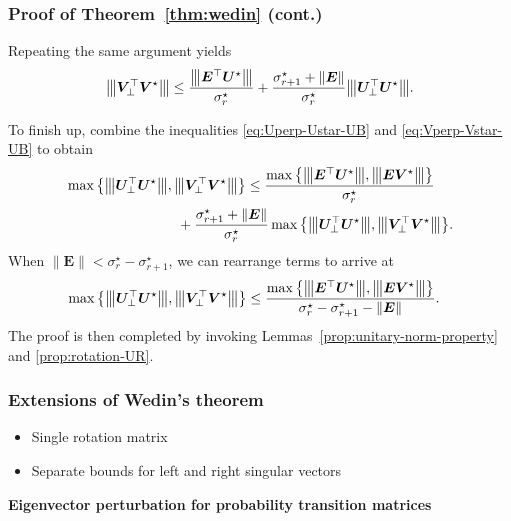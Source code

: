 \documentclass[compress,
mathserif,wide,%
]{beamer}
\begin{document}
\begin{frame}
	\frametitle{Proof of Theorem~\ref{thm:wedin} (cont.)}
	
	Repeating the same argument yields
%
\begin{align}
{\big\vert\kern-0.25ex\big\vert\kern-0.25ex\big\vert \bm{V}_{\perp}^{\top}\bm{V}^{\star} \big\vert\kern-0.25ex\big\vert\kern-0.25ex\big\vert}\leq\frac{{\big\vert\kern-0.25ex\big\vert\kern-0.25ex\big\vert \bm{E}^{\top}\bm{U}^{\star} \big\vert\kern-0.25ex\big\vert\kern-0.25ex\big\vert}}{\sigma_{r}^{\star}}
	+\frac{\sigma_{r+1}^{\star}+\|\bm{E}\|}{\sigma_{r}^{\star}}{\big\vert\kern-0.25ex\big\vert\kern-0.25ex\big\vert \bm{U}_{\perp}^{\top}\bm{U}^{\star} \big\vert\kern-0.25ex\big\vert\kern-0.25ex\big\vert}.
	\label{eq:Vperp-Vstar-UB}
\end{align}


To finish up, combine the inequalities \eqref{eq:Uperp-Ustar-UB} and \eqref{eq:Vperp-Vstar-UB} to obtain
%
\begin{align*}
 & \max\big\{ \vertiiibig{\bm{U}_{\perp}^{\top}\bm{U}^{\star}},\vertiiibig{\bm{V}_{\perp}^{\top}\bm{V}^{\star}}\big\}
  \leq \frac{  \max\big\{  \vertiiibig{\bm{E}^{\top}\bm{U}^{\star}},\vertiiibig{\bm{E}\bm{V}^{\star}}  \big\} }{\sigma_r^{\star}}  \\
	&	\qquad\qquad\qquad\qquad
	+ \frac{\sigma_{r+1}^{\star}+\|\bm{E}\|}{\sigma_{r}^{\star}} \max\big\{ \vertiiibig{\bm{U}_{\perp}^{\top}\bm{U}^{\star}},\vertiiibig{\bm{V}_{\perp}^{\top}\bm{V}^{\star}}\big\} .
\end{align*}
%
When $\|\bm{E}\|<\sigma_r^{\star} - \sigma_{r+1}^{\star}$, we can rearrange terms to arrive at
%
\begin{align*}
 & \max\big\{ {\big\vert\kern-0.25ex\big\vert\kern-0.25ex\big\vert \bm{U}_{\perp}^{\top}\bm{U}^{\star} \big\vert\kern-0.25ex\big\vert\kern-0.25ex\big\vert},{\big\vert\kern-0.25ex\big\vert\kern-0.25ex\big\vert \bm{V}_{\perp}^{\top}\bm{V}^{\star} \big\vert\kern-0.25ex\big\vert\kern-0.25ex\big\vert}\big\}
	\leq\frac{\max\big\{ {\big\vert\kern-0.25ex\big\vert\kern-0.25ex\big\vert \bm{E}^{\top}\bm{U}^{\star} \big\vert\kern-0.25ex\big\vert\kern-0.25ex\big\vert},{\big\vert\kern-0.25ex\big\vert\kern-0.25ex\big\vert \bm{E}\bm{V}^{\star} \big\vert\kern-0.25ex\big\vert\kern-0.25ex\big\vert}\big\} }{\sigma_{r}^{\star}-\sigma_{r+1}^{\star}-\|\bm{E}\|}.
\end{align*}
%
The proof is then completed by invoking Lemmas~\ref{prop:unitary-norm-property} and \ref{prop:rotation-UR}.
\end{frame}

\begin{frame}
	\frametitle{Extensions of Wedin's theorem}
	\begin{itemize}
		\item Single rotation matrix
		\item Separate bounds for left and right singular vectors
	\end{itemize}
\end{frame}


\begin{frame}[plain]

\vfill
\begin{center}
  {\Large\bf Eigenvector perturbation for probability transition matrices}
\end{center}
\vfill

\end{frame}
\end{document}
